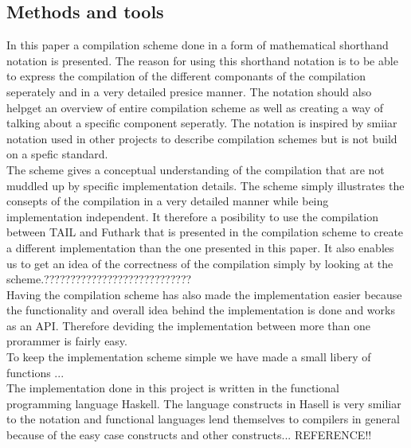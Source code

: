 \documentclass[11pt]{article}
\begin{document}

\subsection{Methods and tools}
In this paper a compilation scheme done in a form of mathematical shorthand notation is presented. 
The reason for using this shorthand notation is to be able to express the compilation of the different componants of the compilation seperately and in a very detailed presice manner. 
The notation should also helpget an overview of entire compilation scheme as well as creating a way of talking about a specific component seperatly. The notation is inspired by smiiar notation used in other projects \cite{TorbenMogensen}\cite{MartinElsmanNotation} to describe compilation schemes but is not build on a spefic standard. \\

The scheme gives a conceptual understanding of the compilation that are not muddled up by specific implementation details. The scheme simply illustrates the consepts of the compilation in a very detailed manner while being implementation independent. It therefore a posibility to use the compilation between TAIL and Futhark that is presented in the compilation scheme to create a different implementation than the one presented in this paper.
It also enables us to get an idea of the correctness of the compilation simply by looking at the scheme.????????????????????????????\\

Having the compilation scheme has also made the implementation easier because the functionality and overall idea behind the implementation is done and works as an API. Therefore deviding the implementation between more than one prorammer is fairly easy. \\

To keep the implementation scheme simple we have made a small libery of functions ...\\ %

The implementation done in this project is written in the functional programming language Haskell. The language constructs in Hasell is very smiliar to the notation and functional languages lend themselves to compilers in general because of the easy case constructs and other constructs... REFERENCE!! %
\end{document}
